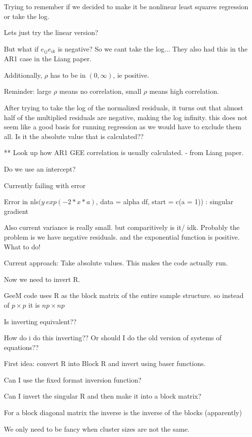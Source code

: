 \documentclass[10pt]{article}
\begin{document}
Trying to remember if we decided to make it be nonlinear least squares regression or take the log.

Lets just try the linear version?

But what if $e_{ij}e_{ik}$ is negative? So we cant take the log... They also had this in the AR1 case in the Liang paper.

Additionally, $\rho$ has to be in $(0,\infty)$, ie positive.

Reminder: large $\rho$ means no correlation, small $\rho$ means high correlation.

After trying to take the log of the normalized residuals, it turns out that almost half of the multiplied residuals are negative, making the log infinity. this does not seem like a good basis for running regression as we would have to exclude them all. Is it the absolute value that is calculated??

** Look up how AR1 GEE correlation is usually calculated. - from Liang paper.

Do we use an intercept?

Currently failing with error

Error in nls$(y ~ exp(-2 * x * a)$, data = alpha df, start = c(a = 1)) :
  singular gradient

Also current variance is really small. but comparitively is it/ idk.
Probably the problem is we have negative residuals. and the exponential function is positive. What to do!

Current approach: Take absolute values. This makes the code actually run.

Now we need to invert R.

GeeM code uses R as the block matrix of the entire sample structure. so instead of $p \times p$ it is $np \times np$

Is inverting equivalent??

How do i do this inverting??
Or should I do the old version of systems of equations??

First idea: convert R into Block R and invert using baser functions.

Can I use the fixed format inversion function?

Can I invert the singular R and then make it into a block matrix?

For a block diagonal matrix the inverse is the inverse of the blocks (apparently)

We only need to be fancy when cluster sizes are not the same.
\end{document}
